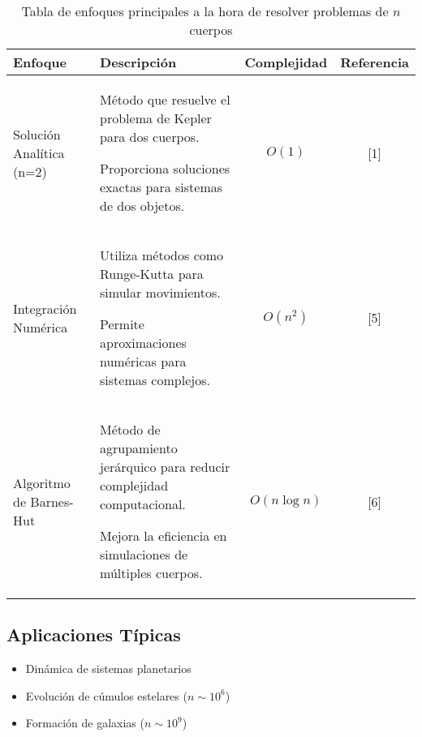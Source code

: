 \begin{table}[H]
    \centering
    \caption[Enfoques en $n$ cuerpos]{\small Tabla de enfoques principales a la hora de resolver problemas de $n$ cuerpos}%
    \label{tab:EnfoquesNCuerpos}
    \begin{adjustbox}{max width=\linewidth}
        \begin{tabular}{@{}p{}p{}cc@{}}
            \toprule
            \textbf{Enfoque} & \textbf{Descripción} & \textbf{Complejidad} & \textbf{Referencia} \\
            \midrule
            Solución Analítica (n=2) &
            Método que resuelve el problema de Kepler para dos cuerpos.

            Proporciona soluciones exactas para sistemas de dos objetos. &
            $O(1)$ & [1] \\
            \midrule
            Integración Numérica &
            Utiliza métodos como Runge-Kutta para simular movimientos.

            Permite aproximaciones numéricas para sistemas complejos. &
            $O(n^2)$ & [5] \\
            \midrule
            Algoritmo de Barnes-Hut &
            Método de agrupamiento jerárquico para reducir complejidad computacional.

            Mejora la eficiencia en simulaciones de múltiples cuerpos. &
            $O(n \log n)$ & [6] \\
            \bottomrule
        \end{tabular}
    \end{adjustbox}
\end{table}

\subsection{Aplicaciones Típicas}
\begin{itemize}
    \item Dinámica de sistemas planetarios
    \item Evolución de cúmulos estelares ($n \sim 10^6$)
    \item Formación de galaxias ($n \sim 10^9$)
\end{itemize}

